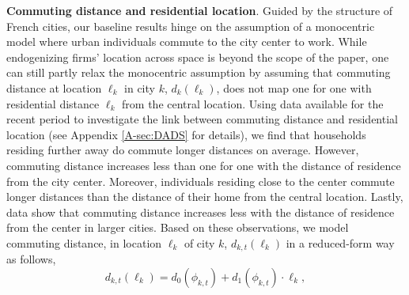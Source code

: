 \documentclass[./20250130-paper.tex]{subfiles}
\begin{document}

\textbf{Commuting distance and residential location}. Guided by the structure of French cities, our baseline results hinge on the assumption of a monocentric model where urban individuals commute to the city center to work. While endogenizing firms' location across space is beyond the scope of the paper, one can still partly relax the monocentric assumption by assuming that commuting distance at location $\ell_k$ in city $k$, $d_k(\ell_k)$, does not map one for one with residential distance $\ell_k$ from the central location. Using data available for the recent period to investigate the link between commuting distance and residential location (see Appendix \ref{A-sec:DADS} for details), we find that households residing further away do commute longer distances on average. However, commuting distance increases less than one for one with the distance of residence from the city center. Moreover, individuals residing close to the center commute longer distances than the distance of their home from the central location. Lastly, data show that commuting distance increases less with the distance of residence from the center in larger cities. Based on these observations, we model commuting distance, in location $\ell_k$ of city $k$, $d_{k,t}(\ell_k)$ in a reduced-form way as follows,
\begin{equation}
d_{k,t}(\ell_k)=d_0(\phi_{k,t})+d_1(\phi_{k,t})\cdot\ell_k, \label{eq:commdistanceextension}
\end{equation}
\end{document}
